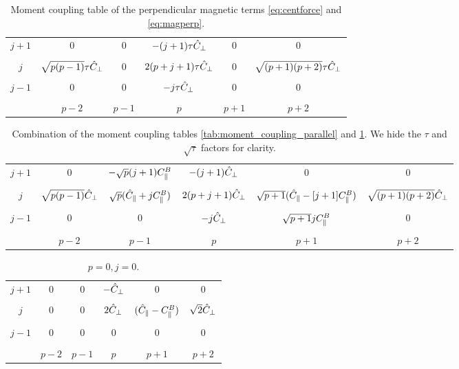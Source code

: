\documentclass{article}
\begin{document}
    \begin{table}[h]
    \centering
    \begin{tabular}{c|ccccc}
    $j+1$ & $0$ & $0$ & $-(j+1)\tau\hat C_{\perp}$ & $0$ & $0$ \\
    & & & & & \\
    $j$   & $\sqrt{p(p-1)}\tau\hat C_{\perp}$ & $0$ & $2(p+j+1)\tau\hat C_{\perp}$ & $0$ & $\sqrt{(p+1)(p+2)}\tau\hat C_{\perp}$ \\
    & & & & & \\
    $j-1 $& $0$ & $0$ & $-j\tau\hat C_{\perp}$ & $0$ & $0$ \\
    & & & & & \\
    \hline
          & $p-2$ & $p-1$ & $p$ & $p+1$ & $p+2$
    \end{tabular}
    \caption{Moment coupling table of the perpendicular magnetic terms \eqref{eq:centforce} and \eqref{eq:magperp}.}
    \label{tab:moment_coupling_perpendicular}
    \end{table}
    
    \begin{table}[h]
        \centering
        \begin{tabular}{c|ccccc}
        $j+1$ & $0$ & $-\sqrt{p}(j+1)C_{\parallel}^{B}$ & $-(j+1)\hat C_{\perp}$ & $0$ & $0$ \\
        & & & & & \\
        $j$   & $\sqrt{p(p-1)}\hat C_{\perp}$ & $\sqrt{p}(\hat C_{\parallel} + j C_{\parallel}^{B})$ & $2(p+j+1)\hat C_{\perp}$ & $\sqrt{p+1}(\hat C_{\parallel} - [j+1]C_{\parallel}^{B})$ & $\sqrt{(p+1)(p+2)}\hat C_{\perp}$ \\
        & & & & & \\
        $j-1 $& $0$ & $0$ & $-j\hat C_{\perp}$ & $\sqrt{p+1}jC_{\parallel}^{B}$ & $0$ \\
        & & & & & \\
        \hline
              & $p-2$ & $p-1$ & $p$ & $p+1$ & $p+2$
        \end{tabular}
        \caption{Combination of the moment coupling tables \ref{tab:moment_coupling_parallel} and \ref{tab:moment_coupling_perpendicular}.
        We hide the $\tau$ and $\sqrt{\tau}$ factors for clarity.}
        \label{tab:moment_coupling_all}
    \end{table}
    
    \begin{table}[h]
        \centering
        \begin{tabular}{c|ccccc}
        $j+1$ & $0$ & $0$ & $-\hat C_{\perp}$ & $0$ & $0$ \\
        & & & & & \\
        $j$   & $0$ & $0$ & $2\hat C_{\perp}$ & $(\hat C_{\parallel} - C_{\parallel}^{B})$ & $\sqrt{2}\hat C_{\perp}$ \\
        & & & & & \\
        $j-1 $& $0$ & $0$ & $0$ & $0$ & $0$ \\
        & & & & & \\
        \hline
              & $p-2$ & $p-1$ & $p$ & $p+1$ & $p+2$
        \end{tabular}
        \caption{$p=0, j=0$.}
    \end{table}
    
\end{document}
